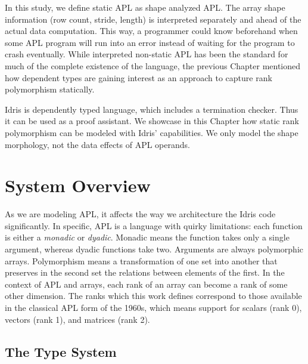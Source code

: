 \documentclass{report}
\begin{document}
In this study, we define static APL as shape analyzed APL. The array shape information (row count, stride, length) is interpreted separately and ahead of the actual data computation. This way, a programmer could know beforehand when some APL program will run into an error instead of waiting for the program to crash eventually. While interpreted non-static APL has been the standard for much of the complete existence of the language, the previous Chapter mentioned how dependent types are gaining interest as an approach to capture rank polymorphism statically.

Idris is dependently typed language, which includes a termination checker. Thus it can be used as a proof assistant. We showcase in this Chapter how static rank polymorphism can be modeled with Idris' capabilities. We only model the shape morphology, not the data effects of APL operands.

\section{System Overview}
\label{sc:sys}

As we are modeling APL, it affects the way we architecture the Idris code significantly. In specific, APL is a language with quirky limitations: each function is either a \emph{monadic} or \emph{dyadic}. Monadic means the function takes only a single argument, whereas dyadic functions take two. Arguments are always polymorphic arrays. Polymorphism means a transformation of one set into another that preserves in the second set the relations between elements of the first. In the context of APL and arrays, each rank of an array can become a rank of some other dimension. The ranks which this work defines correspond to those available in the classical APL form of the 1960s, which means support for scalars (rank 0), vectors (rank 1), and matrices (rank 2).

\subsection{The Type System}
\end{document}
